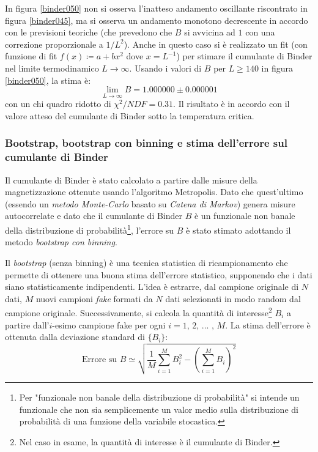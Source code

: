 \documentclass[10pt,a4paper]{article}
\begin{document}
In figura \ref{binder050} non si osserva l'inatteso andamento oscillante riscontrato in figura \ref{binder045}, ma si osserva un andamento monotono decrescente in accordo con le previsioni teoriche (che prevedono che $B$ si avvicina ad $1$ con una correzione proporzionale a $1/L^2$). Anche in questo caso si è realizzato un fit (con funzione di fit $f(x)\coloneqq a+bx^2$ dove $x=L^{-1}$) per stimare il cumulante di Binder nel limite termodinamico $L \rightarrow \infty$. Usando i valori di $B$ per $L\ge140$ in figura  \ref{binder050}, la stima è: 
$$\lim_{L \to \infty}B=1.000000\pm0.000001$$ con un chi quadro ridotto di $\chi^2/NDF=0.31$. Il risultato è in accordo con il valore atteso del cumulante di Binder sotto la temperatura critica.

\subsubsection{Bootstrap, bootstrap con binning e stima dell'errore sul cumulante di Binder}\label{ParErrBinder}
Il cumulante di Binder è stato calcolato a partire dalle misure della magnetizzazione ottenute usando l'algoritmo Metropolis. Dato che quest'ultimo (essendo un \emph{metodo Monte-Carlo} basato su \emph{Catena di Markov}) genera misure autocorrelate e dato che il cumulante di Binder $B$ è un funzionale non banale della distribuzione di probabilità\footnote{Per "funzionale non banale della distribuzione di probabilità" si intende un funzionale che non sia semplicemente un valor medio sulla distribuzione di probabilità di una funzione della variabile stocastica.}, l'errore su $B$ è stato stimato adottando il metodo \emph{bootstrap con binning}.

Il \emph{bootstrap} (senza binning) è una tecnica statistica di ricampionamento che permette di ottenere una buona stima dell'errore statistico, supponendo che i dati siano statisticamente indipendenti. L'idea è estrarre, dal campione originale di $N$ dati, $M$ nuovi campioni \emph{fake} formati da $N$ dati selezionati in modo random dal campione originale. Successivamente, si calcola la quantità di interesse\footnote{Nel caso in esame, la quantità di interesse è il cumulante di Binder.} $B_i$ a partire dall'$i$-esimo campione fake per ogni $i=1\text{, 2, ... , }M$.  La stima dell'errore è ottenuta dalla deviazione standard di $\{B_i\}$:
$$\text{Errore su } B\simeq \sqrt{\frac{1}{M}\sum_{i=1}^{M}B_i^2-\left(\sum_{i=1}^{M}B_i\right)^2}$$
\end{document}
